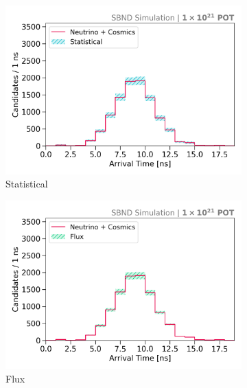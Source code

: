 \begin{figure}[htbp!]
        \begin{subfigure}[b]{0.45\textwidth}   
            \centering 
            \includegraphics[width=\textwidth]{bkg_statistics_error}
            \caption{Statistical}%
            \label{fig:bkg_stat}
        \end{subfigure}
        \hfill
        \begin{subfigure}[b]{0.45\textwidth}   
            \centering 
            \includegraphics[width=\textwidth]{bkg_flx_error}
            \caption{Flux}%
            \label{fig:bkg_flux}
        \end{subfigure}
        \centering
        \begin{subfigure}[b]{0.45\textwidth}   
            \centering 

\end{subfigure}
\end{figure}
